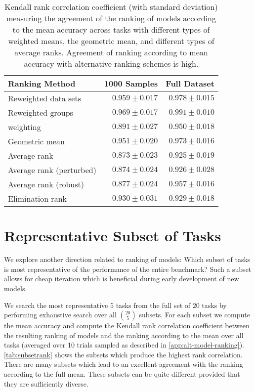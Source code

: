 \documentclass{article}
\begin{document}
\begin{table}[h]
\begin{center}
\begin{tabular}{lrr}
\toprule
\bf Ranking Method & \bf 1000 Samples & \bf Full Dataset \\
\toprule
Reweighted data sets & $0.959\pm0.017$ & $0.978\pm0.015$ \\
Reweighted groups & $0.969\pm0.017$ & $0.991\pm0.010$ \\
\citet{balduzzi2018} weighting & $0.891\pm0.027$ & $0.950\pm0.018$ \\
\midrule
Geometric mean & $0.951\pm0.020$ & $0.973\pm0.016$ \\
Average rank & $0.873\pm0.023$ & $0.925\pm0.019$ \\
Average rank (perturbed) & $0.874\pm0.024$ & $0.926\pm0.028$ \\
Average rank (robust) & $0.877\pm0.024$ & $0.957\pm0.016$ \\
Elimination rank & $0.930\pm0.031$ & $0.929\pm0.018$ \\
\bottomrule
\end{tabular}
 \caption{\label{tab:altrank} Kendall rank correlation coefficient \citep{kendall1945treatment} (with standard deviation) measuring the agreement of the ranking of models according to the mean accuracy across tasks with different types of weighted means, the geometric mean, and different types of average ranks. Agreement of ranking according to mean accuracy with alternative ranking schemes is high.}
\end{center}
\end{table}

\clearpage
\section{Representative Subset of Tasks \label{app:subset-model-ranking}}


We explore another direction related to ranking of models: Which subset of tasks is most representative of the performance of the entire benchmark? Such a subset allows for cheap iteration  which is beneficial during early development of new models. 

We search the most representative $5$ tasks from the full set of $20$ tasks by performing exhaustive search over all $20 \choose 5$ subsets. For each subset we compute the mean accuracy and compute the Kendall rank correlation coefficient between the resulting ranking of models and the ranking according to the mean over all tasks (averaged over 10 trials sampled as described in \cref{app:alt-model-ranking}). \cref{tab:subsetrank} shows the subsets which produce the highest rank correlation. There are many subsets which lead to an excellent agreement with the ranking according to the full mean. These subsets can be quite different provided that they are sufficiently diverse.
\end{document}
